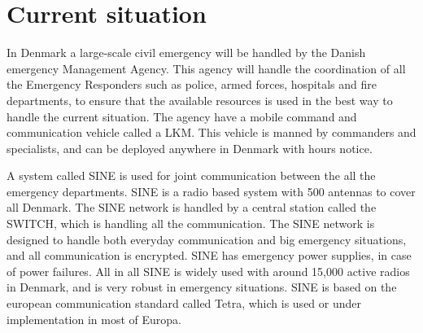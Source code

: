 \section{Current situation}

In Denmark a large-scale civil emergency will be handled by the Danish emergency Management Agency. This agency will handle the coordination of all the Emergency Responders such as police, armed forces, hospitals and fire departments, to ensure that the available resources is used in the best way to handle the current situation. The agency have a mobile command and communication vehicle called a LKM. This vehicle is manned by commanders and specialists, and can be deployed anywhere in Denmark with hours notice.

A system called SINE is used for joint communication between the all the emergency departments. SINE is a radio based system with 500 antennas to cover all Denmark. The SINE network is handled by a central station called the SWITCH, which is handling all the communication. The SINE network is designed to handle both everyday communication and big emergency situations, and all communication is encrypted. SINE has emergency power supplies, in case of power failures. All in all SINE is widely used with around 15,000 active radios in Denmark, and is very robust in emergency situations. SINE is based on the european communication standard called Tetra, which is used or under implementation in most of Europa.